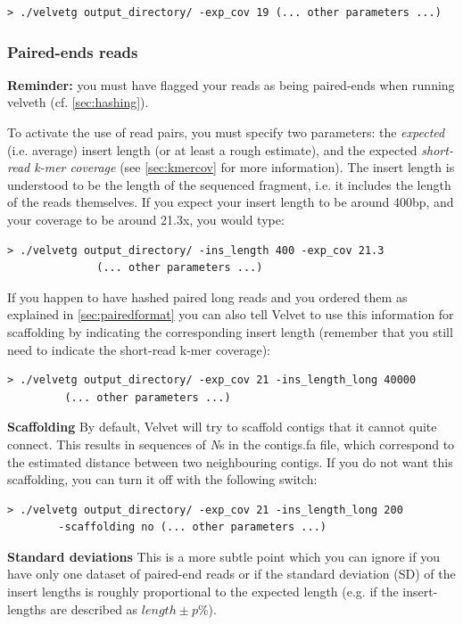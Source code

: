 \documentclass{article}
\begin{document}
\begin{verbatim}
> ./velvetg output_directory/ -exp_cov 19 (... other parameters ...)
\end{verbatim}

	\subsubsection{Paired-ends reads}

\textbf{Reminder:} you must have flagged your reads as being paired-ends when running
velveth (cf. \ref{sec:hashing}).

To activate the use of read pairs, you must specify two parameters: the \emph{expected} (i.e. average) insert length (or at least a rough estimate), and the expected \emph{short-read k-mer coverage} (see \ref{sec:kmercov} for more information). The insert length is understood to be the length of the sequenced fragment, i.e. it includes the length of the reads themselves. If you expect your insert length to be around 400bp, and your coverage to be around 21.3x, you would type:

\begin{verbatim}
> ./velvetg output_directory/ -ins_length 400 -exp_cov 21.3 
	          (... other parameters ...)
\end{verbatim}

If you happen to have hashed paired long reads and you ordered them as explained in \ref{sec:pairedformat} you can also tell Velvet to use this information for scaffolding by indicating the corresponding insert length (remember that you still need to indicate the short-read k-mer coverage):

\begin{verbatim}
> ./velvetg output_directory/ -exp_cov 21 -ins_length_long 40000 
		 (... other parameters ...)
\end{verbatim}

\textbf{Scaffolding} By default, Velvet will try to scaffold contigs that it cannot quite connect. This results in sequences of \emph{N}s in the contigs.fa file, which correspond to the estimated distance between two neighbouring contigs. If you do not want this scaffolding, you can turn it off with the following switch:

\begin{verbatim}
> ./velvetg output_directory/ -exp_cov 21 -ins_length_long 200
		-scaffolding no (... other parameters ...)
\end{verbatim}

\textbf{Standard deviations} This is a more subtle point which you can ignore if you have only one dataset of paired-end reads or if the standard deviation (SD) of the insert lengths is roughly proportional to the expected length (e.g. if the insert-lengths are described as $length \pm p\%$).
\end{document}
